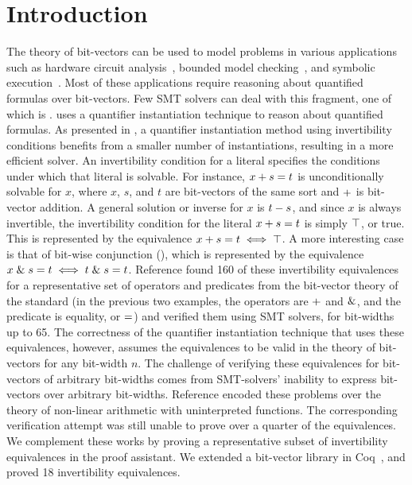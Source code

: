 \documentclass[10pt,conference]{IEEEtran}
\begin{document}
\section{Introduction}
\label{sec:intro}
The theory of bit-vectors can be used to model problems 
in various applications such as hardware 
circuit analysis~\cite{Gupta:1993:RSM:259794.259827}, 
bounded model checking~\cite{Armando2008BoundedMC}, and symbolic execution~\cite{Cadar:2006:EAG:1180405.1180445}. Most of 
these applications require reasoning about quantified 
formulas over bit-vectors. Few SMT solvers can deal 
with this fragment, one of which is \cvcfour. \cvcfour 
uses a quantifier 
instantiation technique to reason about quantified formulas. 
As presented in \cite{b1}, a quantifier instantiation 
method using invertibility conditions benefits from a smaller 
number of instantiations, resulting in a more efficient 
solver. An invertibility condition for a literal specifies 
the conditions under which that literal is solvable. For 
instance, $x + s = t$ is unconditionally solvable 
for $x$, where $x$, $s$, and $t$ are bit-vectors of the 
same sort and $+$ is bit-vector addition. 
A general solution or inverse for $x$ is $t - s$, and 
since $x$ is always invertible, the invertibility condition 
for the literal $x + s = t$ is 
simply $\top$, or true. This is represented by the equivalence 
$x + s = t \iff \top$. 
A more interesting case is that 
of bit-wise conjunction (\bvand{}{}), which is represented by the 
equivalence 
$x \mathrel{\&} s = t \iff t \mathrel{\&} s = t$.
Reference \cite{b1} found 
160 of these invertibility equivalences for a 
representative set of operators and predicates from the 
bit-vector theory of the \smtlib standard 
(in the previous two examples, the operators are 
$+$ and $\mathrel{\&}$, 
and the predicate is equality, or $=$) and verified them 
using SMT solvers, for bit-widths up to 65. The correctness of the quantifier 
instantiation technique that uses these equivalences,
however, assumes the equivalences to be valid in the 
theory of bit-vectors for any bit-width $n$.
The challenge of verifying these equivalences for 
bit-vectors of arbitrary bit-widths comes from 
SMT-solvers' inability to express bit-vectors over
arbitrary bit-widths. Reference \cite{b2} encoded 
these problems over the theory of non-linear arithmetic 
with uninterpreted functions. The corresponding verification 
attempt was still unable to prove over a quarter of the 
equivalences. We complement these works by proving a 
representative subset of invertibility equivalences in 
the \coq proof assistant. We extended a bit-vector 
library in Coq~\cite{DBLP:conf/cav/EkiciMTKKRB17}, and proved 18 invertibility equivalences.
\end{document}
